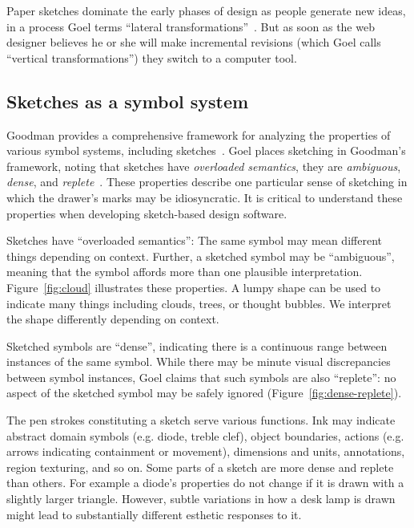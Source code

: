 Paper sketches dominate the early phases of design as people generate
new ideas, in a process Goel terms ``lateral
transformations''~\cite{goel-sketches-of-thought}. But as soon as the
web designer believes he or she will make incremental revisions (which
Goel calls ``vertical transformations'') they switch to a computer
tool.

\subsection{Sketches as a symbol system}



Goodman provides a comprehensive framework for analyzing the
properties of various symbol systems, including
sketches~\cite{goodman-symbols}. Goel places sketching in Goodman's
framework, noting that sketches have \textit{overloaded semantics},
they are \textit{ambiguous}, \textit{dense}, and
\textit{replete}~\cite{goel-sketches-of-thought}. These properties
describe one particular sense of sketching in which the drawer's marks
may be idiosyncratic. It is critical to understand these properties
when developing sketch-based design software.

Sketches have ``overloaded semantics'': The same symbol may mean
different things depending on context. Further, a sketched symbol may
be ``ambiguous'', meaning that the symbol affords more than one
plausible interpretation.  Figure~\ref{fig:cloud} illustrates these
properties. A lumpy shape can be used to indicate many things
including clouds, trees, or thought bubbles. We interpret the shape
differently depending on context.

Sketched symbols are ``dense'', indicating there is a continuous range
between instances of the same symbol. While there may be minute visual
discrepancies between symbol instances, Goel claims that such symbols
are also ``replete'': no aspect of the sketched symbol may be safely
ignored (Figure~\ref{fig:dense-replete}).

The pen strokes constituting a sketch serve various functions. Ink may
indicate abstract domain symbols (e.g. diode, treble clef), object
boundaries, actions (e.g. arrows indicating containment or movement),
dimensions and units, annotations, region texturing, and so on. Some
parts of a sketch are more dense and replete than others. For example
a diode's properties do not change if it is drawn with a slightly
larger triangle. However, subtle variations in how a desk lamp is
drawn might lead to substantially different esthetic responses to it.

